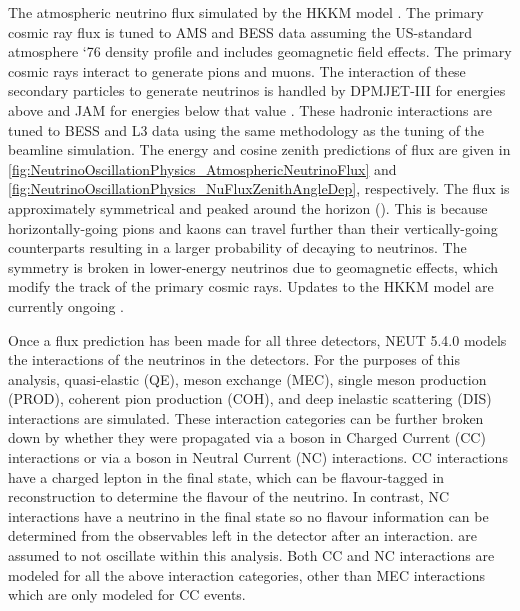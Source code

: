 The atmospheric neutrino flux   simulated by the HKKM model \cite{Honda_2007, Honda:2011}. The primary cosmic ray flux is tuned to AMS \cite{Blau2002} and BESS \cite{Haino2004} data assuming the US-standard atmosphere `76 \cite{USStandardAtm} density profile and includes geomagnetic field effects. The primary cosmic rays interact to generate pions and muons. The interaction of these secondary particles to generate neutrinos is handled by DPMJET-III \cite{Roesler2001} for energies above  and JAM \cite{Niita2006, Honda:2011} for energies below that value . These hadronic interactions are tuned to BESS and L3 data \cite{Sanuki_2002, Achard_2004} using the same methodology as the tuning of the beamline simulation. The energy and cosine zenith predictions of  flux are given in \autoref{fig:NeutrinoOscillationPhysics_AtmosphericNeutrinoFlux} and \autoref{fig:NeutrinoOscillationPhysics_NuFluxZenithAngleDep}, respectively. The flux is approximately symmetrical and peaked around the horizon (). This is because horizontally-going pions and kaons can travel further than their vertically-going counterparts resulting in a larger probability of decaying to neutrinos. The symmetry is broken in lower-energy neutrinos due to geomagnetic effects, which modify the track of the primary cosmic rays. Updates to the HKKM model are currently ongoing \cite{Sato2022-ss}.

Once a flux prediction has been made for all three detectors, NEUT 5.4.0 \cite{Hayato2021, neut} models the interactions of the neutrinos in the detectors. For the purposes of this analysis, quasi-elastic (QE), meson exchange (MEC), single meson production (PROD), coherent pion production (COH), and deep inelastic scattering (DIS) interactions are simulated. These interaction categories can be further broken down by whether they were propagated via a  boson in Charged Current (CC) interactions or via a  boson in Neutral Current (NC) interactions. CC interactions have a charged lepton in the final state, which can be flavour-tagged in reconstruction to determine the flavour of the neutrino. In contrast, NC interactions have a neutrino in the final state so no flavour information can be determined from the observables left in the detector after an interaction.   are assumed to not oscillate within this analysis. Both CC and NC interactions are modeled for all the above interaction categories, other than MEC interactions which are only modeled for CC events. 

